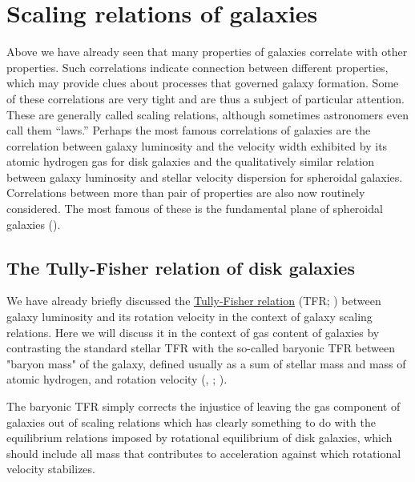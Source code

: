 \section{Scaling relations of galaxies}
\label{sec:scalingrelns}

Above we have already seen that many properties of galaxies correlate with other properties. Such correlations indicate connection between different properties, which may provide clues about processes that governed galaxy formation. Some of these correlations are very tight and are thus a subject of particular attention. These are generally called scaling relations, although sometimes astronomers even call them ``laws.''  
Perhaps the most famous correlations of galaxies are the \href{http://adsabs.harvard.edu/abs/1977A%26A....54..661T}{\citet{tully_fisher77}} correlation between galaxy luminosity and the velocity width exhibited by its atomic hydrogen gas for disk galaxies and the qualitatively similar\href{http://adsabs.harvard.edu/abs/1976ApJ...204..668F}{\citet{faber_jackson76}}  relation between galaxy luminosity and stellar velocity dispersion for spheroidal galaxies. Correlations between more than pair of properties are also now routinely considered. The most famous of these is the fundamental plane of spheroidal galaxies (). 

\subsection{The Tully-Fisher relation of disk galaxies}

We have already briefly discussed the \href{http://www.scholarpedia.org/article/Tully-Fisher_relation}{Tully-Fisher relation} (TFR; \href{http://adsabs.harvard.edu/abs/1977A&A....54..661T}{\citealt{tully_fisher77}}) between galaxy luminosity and its rotation velocity in the context of galaxy scaling relations. Here we will discuss it in the context of gas content of galaxies by contrasting the standard stellar TFR with the so-called baryonic TFR between "baryon mass" of the galaxy, defined usually as a sum of stellar mass and mass of atomic hydrogen, and rotation velocity (\href{http://adsabs.harvard.edu/abs/2005ApJ...632..859M}{\citealt{mcgaugh05}}, \href{http://adsabs.harvard.edu/abs/2012AJ....143...40M}{\citealt{mcgaugh_etal12}}; \href{http://adsabs.harvard.edu/abs/2006ApJ...653..240G}{\citealt{geha_etal06}}). 

The baryonic TFR simply corrects the injustice of leaving the gas component of galaxies out of scaling relations which has clearly something to do with the equilibrium relations imposed by rotational equilibrium of disk galaxies, which should include all mass that contributes to acceleration against which rotational velocity stabilizes. 

